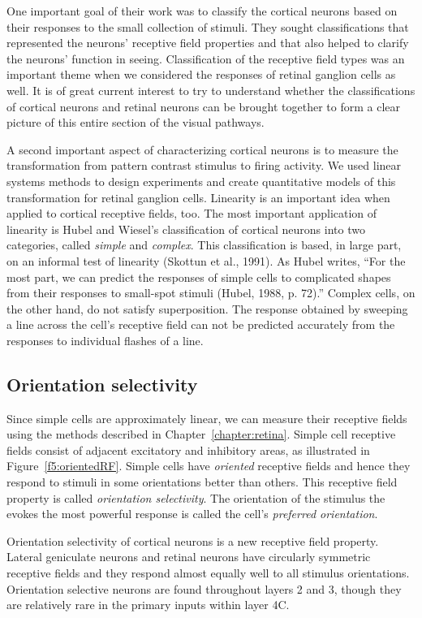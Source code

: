One important goal of their work
was to classify the cortical neurons based on
their responses to the small collection of stimuli.
They sought classifications that represented the neurons'
receptive field properties and that also helped to clarify
the neurons' function in seeing.  
Classification of the receptive field types was an important
theme when we considered the responses of retinal ganglion cells as
well.  
It is of great current interest to try to understand whether
the classifications of cortical neurons and retinal neurons can be
brought together to form a clear picture of this entire section of the
visual pathways.

A second important aspect of characterizing cortical neurons
is to measure the
transformation from pattern contrast stimulus to firing activity. 
We used linear systems methods to design experiments and create
quantitative models of this transformation for retinal
ganglion cells.
Linearity is an important
idea when applied to cortical receptive fields, too.
The most important
application of linearity is Hubel and Wiesel's classification of
cortical neurons into two categories, called {\em simple} and {\em
complex}.  
This classification is based, in large part, on an informal
test of linearity (Skottun et al., 1991).  
As Hubel writes, ``For the most part, we can
predict the responses of simple cells to complicated shapes from their
responses to small-spot stimuli (Hubel, 1988, p. 72).'' 
Complex cells,
on the other hand, do not satisfy superposition.  
The response obtained by
sweeping a line across the cell's receptive field can
not be predicted accurately
from the responses to individual flashes of a line.

\subsection*{Orientation selectivity}
Since simple cells are approximately linear, we can measure their
receptive fields using the methods described in
Chapter~\ref{chapter:retina}.  Simple cell receptive fields consist of
adjacent excitatory and inhibitory areas, as illustrated in
Figure~\ref{f5:orientedRF}.
Simple cells have {\em oriented} receptive fields and
hence they respond to
stimuli in some orientations better than others.  
This receptive field
property is called {\em orientation selectivity}.  The orientation of
the stimulus the evokes the most powerful response is called the
cell's {\em preferred orientation}.

Orientation selectivity of cortical neurons is a new receptive field
property.  Lateral geniculate neurons and retinal neurons have
circularly symmetric receptive fields and they respond almost
equally well to
all stimulus orientations.  Orientation selective neurons are found
throughout layers 2 and 3, though they
are relatively rare in the
primary inputs within layer 4C.


